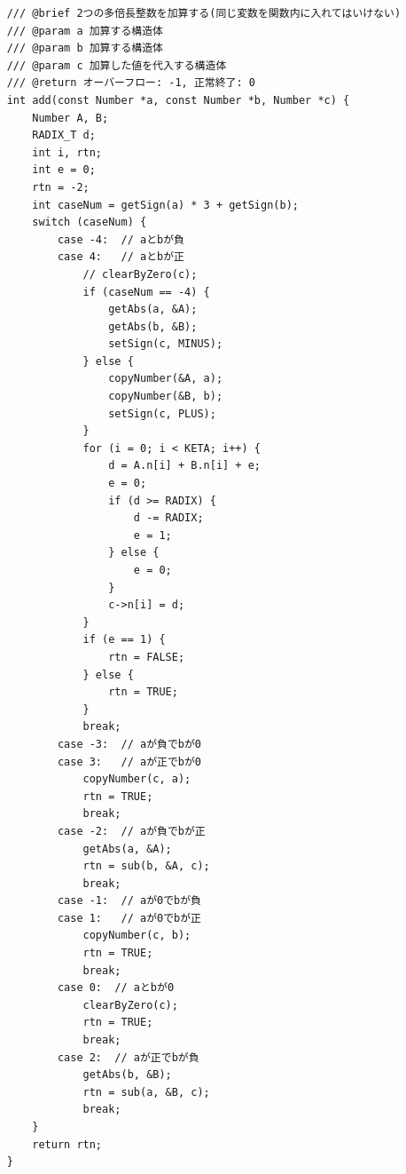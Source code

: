 \documentclass[a4paper,11pt,dvipdfmx]{jsarticle}
\begin{document}
\begin{lstlisting}
    /// @brief 2つの多倍長整数を加算する(同じ変数を関数内に入れてはいけない)
    /// @param a 加算する構造体
    /// @param b 加算する構造体
    /// @param c 加算した値を代入する構造体
    /// @return オーバーフロー: -1, 正常終了: 0
    int add(const Number *a, const Number *b, Number *c) {
        Number A, B;
        RADIX_T d;
        int i, rtn;
        int e = 0;
        rtn = -2;
        int caseNum = getSign(a) * 3 + getSign(b);
        switch (caseNum) {
            case -4:  // aとbが負
            case 4:   // aとbが正
                // clearByZero(c);
                if (caseNum == -4) {
                    getAbs(a, &A);
                    getAbs(b, &B);
                    setSign(c, MINUS);
                } else {
                    copyNumber(&A, a);
                    copyNumber(&B, b);
                    setSign(c, PLUS);
                }
                for (i = 0; i < KETA; i++) {
                    d = A.n[i] + B.n[i] + e;
                    e = 0;
                    if (d >= RADIX) {
                        d -= RADIX;
                        e = 1;
                    } else {
                        e = 0;
                    }
                    c->n[i] = d;
                }
                if (e == 1) {
                    rtn = FALSE;
                } else {
                    rtn = TRUE;
                }
                break;
            case -3:  // aが負でbが0
            case 3:   // aが正でbが0
                copyNumber(c, a);
                rtn = TRUE;
                break;
            case -2:  // aが負でbが正
                getAbs(a, &A);
                rtn = sub(b, &A, c);
                break;
            case -1:  // aが0でbが負
            case 1:   // aが0でbが正
                copyNumber(c, b);
                rtn = TRUE;
                break;
            case 0:  // aとbが0
                clearByZero(c);
                rtn = TRUE;
                break;
            case 2:  // aが正でbが負
                getAbs(b, &B);
                rtn = sub(a, &B, c);
                break;
        }
        return rtn;
    }
    

\end{lstlisting}
\end{document}
